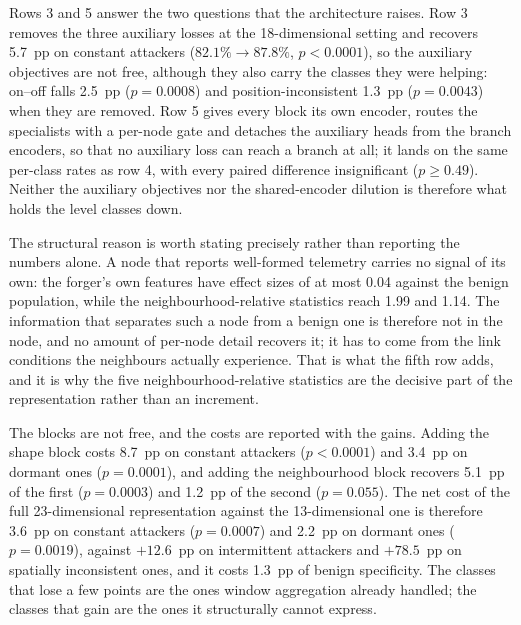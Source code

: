\documentclass[notspecified,article,submit,moreauthors]{Definitions/mdpi}
\begin{document}
Rows 3 and 5 answer the two questions that the architecture raises. Row 3 removes the three auxiliary losses at the 18-dimensional setting and recovers 5.7~pp on constant attackers ($82.1\%\rightarrow87.8\%$, $p<0.0001$), so the auxiliary objectives are not free, although they also carry the classes they were helping: on--off falls 2.5~pp ($p=0.0008$) and position-inconsistent 1.3~pp ($p=0.0043$) when they are removed. Row 5 gives every block its own encoder, routes the specialists with a per-node gate and detaches the auxiliary heads from the branch encoders, so that no auxiliary loss can reach a branch at all; it lands on the same per-class rates as row 4, with every paired difference insignificant ($p\ge0.49$). Neither the auxiliary objectives nor the shared-encoder dilution is therefore what holds the level classes down.

The structural reason is worth stating precisely rather than reporting the numbers alone. A node that reports well-formed telemetry carries no signal of its own: the forger's own features have effect sizes of at most 0.04 against the benign population, while the neighbourhood-relative statistics reach 1.99 and 1.14. The information that separates such a node from a benign one is therefore not in the node, and no amount of per-node detail recovers it; it has to come from the link conditions the neighbours actually experience. That is what the fifth row adds, and it is why the five neighbourhood-relative statistics are the decisive part of the representation rather than an increment.

The blocks are not free, and the costs are reported with the gains. Adding the shape block costs 8.7~pp on constant attackers ($p<0.0001$) and 3.4~pp on dormant ones ($p=0.0001$), and adding the neighbourhood block recovers 5.1~pp of the first ($p=0.0003$) and 1.2~pp of the second ($p=0.055$). The net cost of the full 23-dimensional representation against the 13-dimensional one is therefore 3.6~pp on constant attackers ($p=0.0007$) and 2.2~pp on dormant ones ($p=0.0019$), against $+12.6$~pp on intermittent attackers and $+78.5$~pp on spatially inconsistent ones, and it costs 1.3~pp of benign specificity. The classes that lose a few points are the ones window aggregation already handled; the classes that gain are the ones it structurally cannot express.
\end{document}
